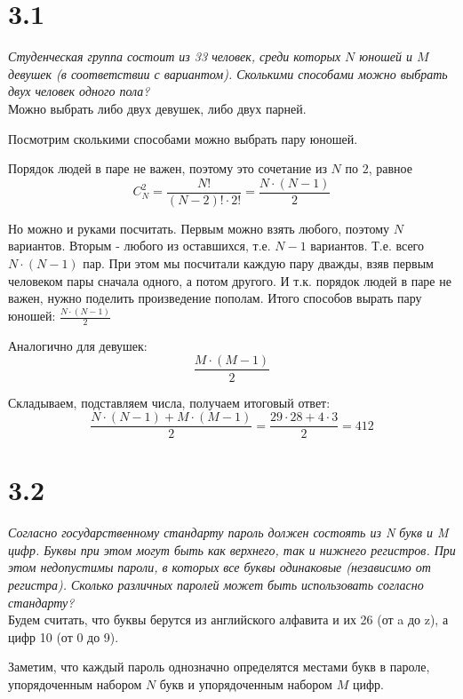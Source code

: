 \documentclass[a4paper,12pt]{article}
\begin{document}
\newpage




\section*{3.1}

\textit{Студенческая группа состоит из 33 человек, среди которых $N$ юношей и $M$ девушек (в соответствии с вариантом).
Сколькими способами можно выбрать двух человек одного пола?}
\\

Можно выбрать либо двух девушек, либо двух парней.

Посмотрим сколькими способами можно выбрать пару юношей.

Порядок людей в паре не важен, поэтому это сочетание из $N$ по $2$, равное $$C_N^2 = \frac{N!}{(N - 2)! \cdot 2!} = \frac{N \cdot (N - 1)}{2}$$

Но можно и руками посчитать.
Первым можно взять любого, поэтому $N$ вариантов.
Вторым - любого из оставшихся, т.е. $N - 1$ вариантов.
Т.е. всего $N \cdot (N - 1)$ пар.
При этом мы посчитали каждую пару дважды, взяв первым человеком пары сначала одного, а потом другого.
И т.к. порядок людей в паре не важен, нужно поделить произведение пополам.
Итого способов вырать пару юношей: $\frac{N \cdot (N - 1)}{2}$

Аналогично для девушек: \[\frac{M \cdot (M - 1)}{2}\]

Складываем, подставляем числа, получаем итоговый ответ: \[\frac{N \cdot (N - 1) + M \cdot (M - 1)}{2} = \frac{29 \cdot 28 + 4 \cdot 3}{2} = 412\]




\section*{3.2}

\textit{Согласно государственному стандарту пароль должен состоять из N букв и M цифр.
Буквы при этом могут быть как верхнего, так и нижнего регистров.
При этом недопустимы пароли, в которых все буквы одинаковые (независимо от регистра).
Сколько различных паролей может быть использовать согласно стандарту?}
\\

Будем считать, что буквы берутся из английского алфавита и их 26 (от a до z), а цифр 10 (от 0 до 9).

Заметим, что каждый пароль однозначно определятся местами букв в пароле, упорядоченным набором $N$ букв и упорядоченным набором $M$ цифр.
\end{document}
